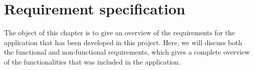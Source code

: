 \chapter{Requirement specification}
\label {sec:recSpecification}

The object of this chapter is to give an overview of the requirements for the application that has been developed in this project. Here, we will discuss both the functional and non-functional requirements, which gives a complete overview of the functionalities that was included in the application.





